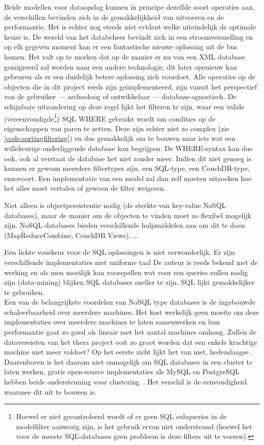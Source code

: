 Beide modellen voor dataopslag kunnen in principe dezelfde soort operaties aan, de verschillen bevinden zich in de gemakkelijkheid van uitvoeren en de performantie. Het is echter nog steeds niet evident welke uiteindelijk de optimale keuze is. De wereld van het databeheer bevindt zich in een stroomversnelling en op elk gegeven moment kan er een fantastische nieuwe oplossing uit de bus komen. Het valt op te merken dat op de manier er nu van een XML database gemigreerd zal worden naar een andere technologie, dit later openieuw kan gebeuren als er een duidelijk betere oplossing zich voordoet. Alle operaties op de objecten die in dit project reeds zijn ge\"implementeerd, zijn vanuit het perspectief van de gebruiker --- archeoloog of ontwikkelaar --- database-agnostisch. De schijnbare uitzondering op deze regel lijkt het filteren te zijn, waar een valide (vereenvoudigde\footnote{Hoewel er niet gecontroleerd wordt of er geen SQL subqueries in de modelfilter aanwezig zijn, is het gebruik ervan niet ondersteund (hoewel het voor de meeste SQL-databases geen probleem is deze filters uit te voeren).}) SQL WHERE gebruikt wordt om condities op de eigenschappen van paren te zetten. Deze zijn echter niet zo complex (zie \ref{code:sortingfiltering}) en dus gemakkelijk om te bouwen naar iets wat een willekeurige onderliggende database kan begrijpen. De WHERE-syntax kan dus ook, ook al verstaat de database het niet zonder meer. Indien dit niet genoeg is kunnen er gewoon meerdere filtertypes zijn, een SQL-type, een CouchDB-type, enzovoort. Een implementatie van een model zal dan zelf moeten uitzoeken hoe het alles moet vertalen of gewoon de filter weigeren.

Niet alleen is objectpersistentie nodig (de sterkte van key-value NoSQL databases), maar de manier om de objecten te vinden moet zo flexibel mogelijk zijn. NoSQL databases bieden verschillende hulpmiddelen aan om dit te doen (MapReduceCombine, CouchDB Views), \ldots 

Een lichte voorkeur voor de SQL oplossingen is niet verwonderlijk. Er zijn verschillende implementaties met uniforme taal De auteur is reeds bekend met de werking en als men moeilijk kan voorspellen wat voor een queries zullen nodig zijn (data-mining) blijken SQL databases sneller te zijn. SQL lijkt gemakkelijker te gebruiken.\\

Een van de belangrijkste voordelen van NoSQL type databases is de ingebouwde schaleerbaarheid over meerdere machines. Het kost werkelijk geen moeite om deze implementaties over meerdere machines te laten samenwerken en hun performantie gaat zo goed als lineair met het aantal machines omhoog. Zullen de datavereisten van het thera project ooit zo groot worden dat een enkele krachtige machine niet meer voldoet? Op het eerste zicht lijkt het van niet, hedendaagse . Daarenboven is het daarom niet onmogelijk om SQL databases in een cluster te laten werken, gratis open-source implementaties als MySQL en PostgreSQL hebben beide ondersteuning voor clustering~\cite{postgrescluster, mysqlcluster}. Het verschil is de eenvoudigheid waarmee dit uit te bouwen is.\\

